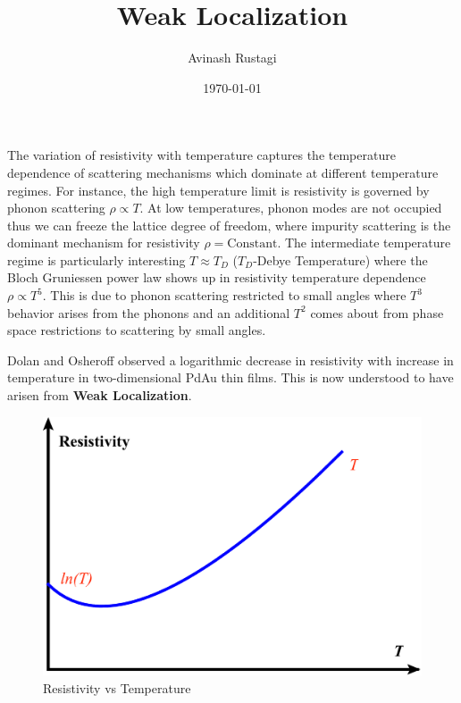 \documentclass[aps,prb,onecolumn,notitlepage,showpacs,floatfix,superscriptaddress]{revtex4-1}
\begin{document}
\title{Weak Localization}

\author{Avinash Rustagi}
%
\date{\today}

\maketitle
%
The variation of resistivity with temperature captures the temperature dependence of scattering mechanisms which dominate at different temperature regimes. For instance, the high temperature limit is resistivity is governed by phonon scattering $\rho \propto T$. At low temperatures, phonon modes are not occupied thus we can freeze the lattice degree of freedom, where impurity scattering is the dominant mechanism for resistivity $\rho = \text{Constant}$. The intermediate temperature regime is particularly interesting $T\approx T_D$ ($T_D$-Debye Temperature) where the Bloch Gruniessen power law shows up in resistivity temperature dependence $\rho \propto T^5$. This is due to phonon scattering restricted to small angles where $T^3$ behavior arises from the phonons and an additional $T^2$ comes about from phase space restrictions to scattering by small angles. 

Dolan and Osheroff observed a logarithmic decrease in resistivity with increase in temperature in two-dimensional PdAu thin films. This is now understood to have arisen from \textbf{Weak Localization}.
\begin{figure}[hbtp]
\centering
\includegraphics[scale=0.1]{Resistivity.png}
\caption{Resistivity vs Temperature}
\end{figure}
\end{document}

